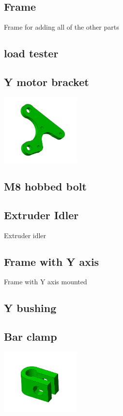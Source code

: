\documentclass[11pt]{article}
\begin{document}
\hypertarget{thing_frame}{\subsection{Frame}}
Frame for adding all of the other parts

\hypertarget{thing_loadtester}{\subsection{load tester}}

\hypertarget{thing_y-motor-bracket}{\subsection{Y motor bracket}}
\includegraphics[width=4cm]{images/y-motor-bracket.jpg}

\hypertarget{thing_hobbed-bolt}{\subsection{M8 hobbed bolt}}

\hypertarget{thing_idler}{\subsection{Extruder Idler}}
Extruder idler

\hypertarget{thing_frame-with-y}{\subsection{Frame with Y axis}}
Frame with Y axis mounted

\hypertarget{thing_y-bushing}{\subsection{Y bushing}}

\hypertarget{thing_bar-clamp}{\subsection{Bar clamp}}
\includegraphics[width=4cm]{images/bar-clamp.jpg}
\end{document}
